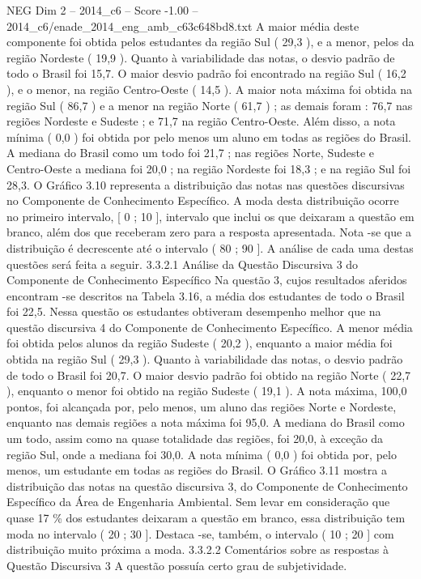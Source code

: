 \begin{textsample}{NEG Dim 2 – 2014\_c6 – Score -1.00 – 2014\_c6/enade\_2014\_eng\_amb\_c63c648bd8.txt}
A maior média deste componente foi obtida pelos estudantes da região Sul ( 29,3 ), e a menor, pelos da região Nordeste ( 19,9 ).
Quanto à variabilidade das notas, o desvio padrão de todo o Brasil foi 15,7.
O maior desvio padrão foi encontrado na região Sul ( 16,2 ), e o menor, na região Centro-Oeste ( 14,5 ).
A maior nota máxima foi obtida na região Sul ( 86,7 ) e a menor na região Norte ( 61,7 ) ; as demais foram : 76,7 nas regiões Nordeste e Sudeste ; e 71,7 na região Centro-Oeste.
Além disso, a nota mínima ( 0,0 ) foi obtida por pelo menos um aluno em todas as regiões do Brasil.
A mediana do Brasil como um todo foi 21,7 ; nas regiões Norte, Sudeste e Centro-Oeste a mediana foi 20,0 ; na região Nordeste foi 18,3 ; e na região Sul foi 28,3.
O Gráfico 3.10 representa a distribuição das notas nas questões discursivas no Componente de Conhecimento Específico.
A moda desta distribuição ocorre no primeiro intervalo, [ 0 ; 10 ], intervalo que inclui os que deixaram a questão em branco, além dos que receberam zero para a resposta apresentada.
Nota -se que a distribuição é decrescente até o intervalo ( 80 ; 90 ].
A análise de cada uma destas questões será feita a seguir. 3.3.2.1 Análise da Questão Discursiva 3 do Componente de Conhecimento Específico Na questão 3, cujos resultados aferidos encontram -se descritos na Tabela 3.16, a média dos estudantes de todo o Brasil foi 22,5.
Nessa questão os estudantes obtiveram desempenho melhor que na questão discursiva 4 do Componente de Conhecimento Específico.
A menor média foi obtida pelos alunos da região Sudeste ( 20,2 ), enquanto a maior média foi obtida na região Sul ( 29,3 ).
Quanto à variabilidade das notas, o desvio padrão de todo o Brasil foi 20,7.
O maior desvio padrão foi obtido na região Norte ( 22,7 ), enquanto o menor foi obtido na região Sudeste ( 19,1 ).
A nota máxima, 100,0 pontos, foi alcançada por, pelo menos, um aluno das regiões Norte e Nordeste, enquanto nas demais regiões a nota máxima foi 95,0.
A mediana do Brasil como um todo, assim como na quase totalidade das regiões, foi 20,0, à exceção da região Sul, onde a mediana foi 30,0.
A nota mínima ( 0,0 ) foi obtida por, pelo menos, um estudante em todas as regiões do Brasil.
O Gráfico 3.11 mostra a distribuição das notas na questão discursiva 3, do Componente de Conhecimento Específico da Área de Engenharia Ambiental.
Sem levar em consideração que quase 17 \% dos estudantes deixaram a questão em branco, essa distribuição tem moda no intervalo ( 20 ; 30 ].
Destaca -se, também, o intervalo ( 10 ; 20 ] com distribuição muito próxima a moda. 3.3.2.2 Comentários sobre as respostas à Questão Discursiva 3 A questão possuía certo grau de subjetividade.

\end{textsample}
